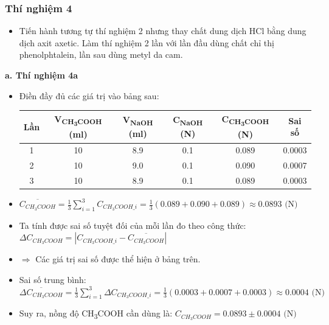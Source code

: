 \subsubsection{Thí nghiệm 4}
\begin{itemize}
    \item Tiến hành tương tự thí nghiệm 2 nhưng thay chất dung dịch HCl bằng dung dịch axit axetic. Làm thí nghiệm 2 lần với lần đầu dùng chất chỉ thị phenolphtalein, lần sau dùng metyl da cam.
\end{itemize}
\textbf{a. Thí nghiệm 4a}
\begin{itemize}
    \item Điền đầy đủ các giá trị vào bảng sau:
    \begin{table}[H]
        \centering
        \begin{tabular}{|c|c|c|c|c|c|}
            \hline
            \textbf{Lần} & \textbf{V\textsubscript{CH\textsubscript{3}COOH} (ml)} & \textbf{V\textsubscript{NaOH} (ml)} & \textbf{C\textsubscript{NaOH} (N)} & \textbf{C\textsubscript{CH\textsubscript{3}COOH} (N)} & \textbf{Sai số} \\
            \hline
            1 & 10 & 8.9 & 0.1 & 0.089 & 0.0003 \\
            \hline
            2 & 10 & 9.0 & 0.1 & 0.090 & 0.0007 \\
            \hline
            3 & 10 & 8.9 & 0.1 & 0.089 & 0.0003 \\
            \hline
        \end{tabular}
    \end{table}
    \item $\overline{C_{CH_3COOH}} = \frac{1}{3}\sum_{i=1}^{3} C_{CH_3COOH\_i} = \frac{1}{3}(0.089 + 0.090 + 0.089) \approx 0.0893 \text{ (N)}$
    \item Ta tính được sai số tuyệt đối của mỗi lần đo theo công thức: $\Delta C_{CH_3COOH} = |C_{CH_3COOH\_i} - \overline{C_{CH_3COOH}}|$
    \item $\Rightarrow$ Các giá trị sai số được thể hiện ở bảng trên.
    \item Sai số trung bình: $\overline{\Delta C_{CH_3COOH}} = \frac{1}{3} \sum_{i=1}^{3} \Delta C_{CH_3COOH\_i} = \frac{1}{3}(0.0003 + 0.0007 + 0.0003) \approx 0.0004 \text{ (N)}$
    \item Suy ra, nồng độ CH\textsubscript{3}COOH cần dùng là: $C_{CH_3COOH} = 0.0893 \pm 0.0004 \text{ (N)}$
\end{itemize}

